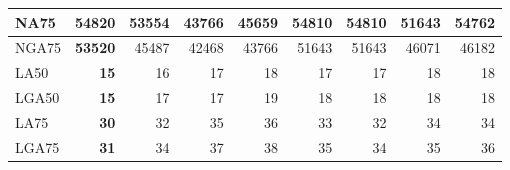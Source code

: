 \documentclass[12pt,a4paper]{article}
\begin{document}
\begin{table}[ht]
\begin{center}
\begin{tabular}{|l*{8}{|r}|}
NA75 & {\bf 54820} & 53554 & 43766 & 45659 & 54810 & 54810 & 51643 & 54762 \\ \hline
NGA75 & {\bf 53520} & 45487 & 42468 & 43766 & 51643 & 51643 & 46071 & 46182 \\ \hline
LA50 & {\bf 15} & 16 & 17 & 18 & 17 & 17 & 18 & 18 \\ \hline
LGA50 & {\bf 15} & 17 & 17 & 19 & 18 & 18 & 18 & 18 \\ \hline
LA75 & {\bf 30} & 32 & 35 & 36 & 33 & 32 & 34 & 34 \\ \hline
LGA75 & {\bf 31} & 34 & 37 & 38 & 35 & 34 & 35 & 36 \\ \hline
\end{tabular}
\end{center}
\end{table}
\end{document}
